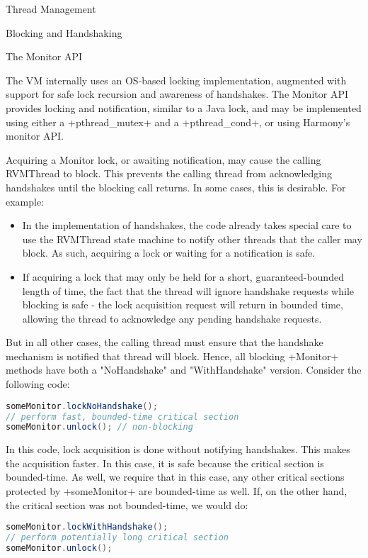 \begin{section}{Thread Management}
\begin{subsection}{Blocking and Handshaking}
\end{subsection}

\begin{subsection}{The Monitor API}

The VM internally uses an OS-based locking implementation, augmented with support for safe lock recursion and awareness of handshakes. The Monitor API provides locking and notification, similar to a Java lock, and may be implemented using either a \spverb+pthread_mutex+ and a \spverb+pthread_cond+, or using Harmony's monitor API.

Acquiring a Monitor lock, or awaiting notification, may cause the calling RVMThread to block. This prevents the calling thread from acknowledging handshakes until the blocking call returns. In some cases, this is desirable. For example:
\begin{itemize}
  \item In the implementation of handshakes, the code already takes special care to use the RVMThread state machine to notify other threads that the caller may block. As such, acquiring a lock or waiting for a notification is safe.
  \item If acquiring a lock that may only be held for a short, guaranteed-bounded length of time, the fact that the thread will ignore handshake requests while blocking is safe - the lock acquisition request will return in bounded time, allowing the thread to acknowledge any pending handshake requests.
\end{itemize}

But in all other cases, the calling thread must ensure that the handshake mechanism is notified that thread will block. Hence, all blocking \spverb+Monitor+ methods have both a "NoHandshake" and "WithHandshake" version. Consider the following code:

\begin{lstlisting}[language=Java]
someMonitor.lockNoHandshake();
// perform fast, bounded-time critical section
someMonitor.unlock(); // non-blocking
\end{lstlisting}

In this code, lock acquisition is done without notifying handshakes. This makes the acquisition faster. In this case, it is safe because the critical section is bounded-time. As well, we require that in this case, any other critical sections protected by \spverb+someMonitor+ are bounded-time as well. If, on the other hand, the critical section was not bounded-time, we would do:

\begin{lstlisting}[language=Java]
someMonitor.lockWithHandshake();
// perform potentially long critical section
someMonitor.unlock();
\end{lstlisting}


\end{subsection}
\end{section}
